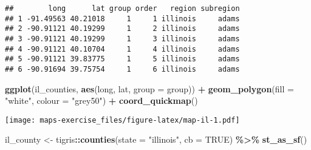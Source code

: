 \documentclass[
]{article}
\newenvironment{Shaded}{\begin{snugshade}}{\end{snugshade}}
\newcommand{\AttributeTok}[1]{\textcolor[rgb]{0.13,0.29,0.53}{#1}}
\newcommand{\ConstantTok}[1]{\textcolor[rgb]{0.56,0.35,0.01}{#1}}
\newcommand{\FunctionTok}[1]{\textcolor[rgb]{0.13,0.29,0.53}{\textbf{#1}}}
\newcommand{\NormalTok}[1]{#1}
\newcommand{\OtherTok}[1]{\textcolor[rgb]{0.56,0.35,0.01}{#1}}
\newcommand{\SpecialCharTok}[1]{\textcolor[rgb]{0.81,0.36,0.00}{\textbf{#1}}}
\newcommand{\StringTok}[1]{\textcolor[rgb]{0.31,0.60,0.02}{#1}}
\begin{document}
\begin{verbatim}
##        long      lat group order   region subregion
## 1 -91.49563 40.21018     1     1 illinois     adams
## 2 -90.91121 40.19299     1     2 illinois     adams
## 3 -90.91121 40.19299     1     3 illinois     adams
## 4 -90.91121 40.10704     1     4 illinois     adams
## 5 -90.91121 39.83775     1     5 illinois     adams
## 6 -90.91694 39.75754     1     6 illinois     adams
\end{verbatim}

\begin{Shaded}
\begin{Highlighting}[]
\FunctionTok{ggplot}\NormalTok{(il\_counties, }\FunctionTok{aes}\NormalTok{(long, lat, }\AttributeTok{group =}\NormalTok{ group)) }\SpecialCharTok{+}
  \FunctionTok{geom\_polygon}\NormalTok{(}\AttributeTok{fill =} \StringTok{"white"}\NormalTok{, }\AttributeTok{colour =} \StringTok{"grey50"}\NormalTok{) }\SpecialCharTok{+} 
  \FunctionTok{coord\_quickmap}\NormalTok{()}
\end{Highlighting}
\end{Shaded}

\texttt{[image: maps-exercise\_files/figure-latex/map-il-1.pdf]}

\begin{Shaded}
\begin{Highlighting}[]
\NormalTok{il\_county }\OtherTok{\textless{}{-}}\NormalTok{ tigris}\SpecialCharTok{::}\FunctionTok{counties}\NormalTok{(}\AttributeTok{state =} \StringTok{"illinois"}\NormalTok{, }\AttributeTok{cb =} \ConstantTok{TRUE}\NormalTok{) }\SpecialCharTok{\%\textgreater{}\%} 
    \FunctionTok{st\_as\_sf}\NormalTok{() }
\end{Highlighting}
\end{Shaded}
\end{document}

